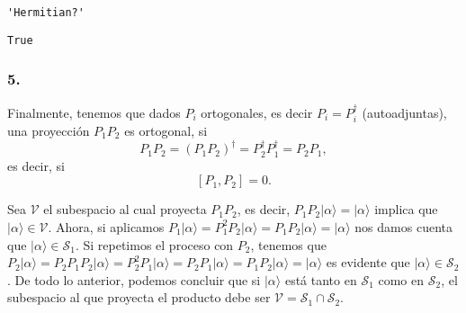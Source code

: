 \documentclass[11pt]{article}
\begin{document}
    
    
    \begin{verbatim}
'Hermitian?'
    \end{verbatim}

    
    
    \begin{verbatim}
True
    \end{verbatim}

    
    \hypertarget{section}{%
\subsubsection{5.}\label{section}}

Finalmente, tenemos que dados \(P_i\) ortogonales, es decir
\(P_i = P_i^\dagger\) (autoadjuntas), una proyección \(P_1P_2\) es
ortogonal, si
\[P_1P_2 = (P_1P_2)^\dagger = P_2^\dagger P_1^\dagger = P_2P_1,\] es
decir, si \[[P_1,P_2]=0.\]

Sea \(\mathcal{V}\) el subespacio al cual proyecta \(P_1P_2\), es decir,
\(P_1P_2\lvert\alpha\rangle=\lvert\alpha\rangle\) implica que
\(\lvert\alpha\rangle \in \mathcal{V}\). Ahora, si aplicamos
\(P_1\lvert\alpha\rangle = P_1^2P_2\lvert\alpha\rangle=P_1P_2\lvert\alpha\rangle = \lvert\alpha\rangle\)
nos damos cuenta que \(\lvert\alpha\rangle\in \mathcal{S}_1\). Si
repetimos el proceso con \(P_2\), tenemos que
\(P_2\lvert\alpha\rangle=P_2P_1P_2\lvert\alpha\rangle = P_2^2P_1 \lvert\alpha\rangle = P_2P_1\lvert\alpha\rangle=P_1P_2\lvert\alpha\rangle=\lvert\alpha\rangle\)
es evidente que \(\lvert\alpha\rangle \in \mathcal{S}_2\). De todo lo
anterior, podemos concluir que si \(\lvert\alpha\rangle\) está tanto en
\(\mathcal{S}_1\) como en \(\mathcal{S}_2\), el subespacio al que
proyecta el producto debe ser
\(\mathcal{V} = \mathcal{S}_1\cap\mathcal{S}_2\).


    
    
    
    
\end{document}
